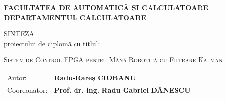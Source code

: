 \documentclass[12pt,a4paper]{report}
\begin{document}
\begin{center}
	{\sffamily\bfseries\small FACULTATEA DE AUTOMATICĂ ȘI CALCULATOARE\\
	DEPARTAMENTUL CALCULATOARE}

	\vspace{0.3cm}

	SINTEZA\\
	proiectului de diplomă cu titlul:

	\vspace{0.3cm}

	{\large\scshape Sistem de Control FPGA pentru Mână Robotică cu Filtrare Kalman}
\end{center}

\vspace{0.4cm}

\noindent
\begin{tabular}{@{}p{3cm}l@{}}
	Autor: & {\bf Radu-Rareș CIOBANU}\\
	Coordonator: & {\bf Prof. dr. ing. Radu Gabriel DĂNESCU}\\
\end{tabular}

\vspace{0.5cm}
\end{document}
